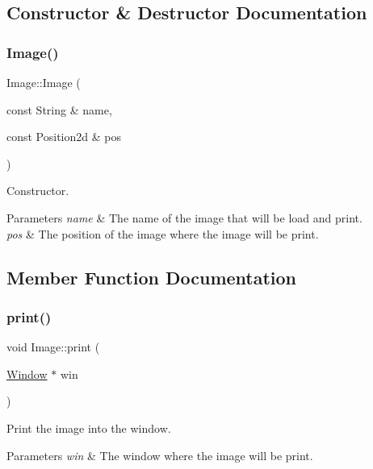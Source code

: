 \subsection{Constructor \& Destructor Documentation}
\mbox{\label{classImage_aca308a45e7c53ec95e244863cb31a738}} 
\subsubsection{\texorpdfstring{Image()}{Image()}}
{\footnotesize\ttfamily Image\+::\+Image (\begin{DoxyParamCaption}\item[{const String \&}]{name,  }\item[{const Position2d \&}]{pos }\end{DoxyParamCaption})}



Constructor. 


\begin{DoxyParams}{Parameters}
{\em name} & The name of the image that will be load and print. \\
\hline
{\em pos} & The position of the image where the image will be print. \\
\hline
\end{DoxyParams}


\subsection{Member Function Documentation}
\mbox{\label{classImage_aca043fb78326d6ce135498419e2d1833}} 
\subsubsection{\texorpdfstring{print()}{print()}}
{\footnotesize\ttfamily void Image\+::print (\begin{DoxyParamCaption}\item[{\hyperlink{classWindow}{Window} $\ast$}]{win }\end{DoxyParamCaption})\hspace{0.3cm}{\ttfamily [virtual]}}



Print the image into the window. 


\begin{DoxyParams}{Parameters}
{\em win} & The window where the image will be print. \\
\hline
\end{DoxyParams}


